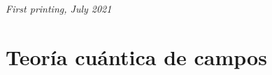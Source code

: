 \documentclass[10pt]{book}
\begin{document}
\noindent \textit{First printing, July 2021} %



\pagestyle{empty} %
\tableofcontents %
\cleardoublepage %
\pagestyle{fancy} %
\part{Teoría cuántica de campos}

 

 

 

 

 
\end{document}
